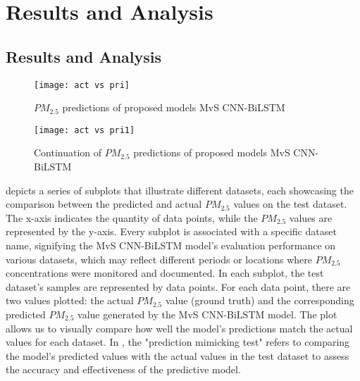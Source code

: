 
\chapter{Results and Analysis} %

\label{c5} %

\section{Results and Analysis}


\begin{figure*}
  \centering
  \texttt{[image: act vs pri]}
  \caption{$PM_{2.5}$ predictions of proposed models MvS CNN-BiLSTM}\label{ACt_vs_Pred}
\end{figure*}
\begin{figure*}
  \centering
  \texttt{[image: act vs pri1]}
  \caption{Continuation of $PM_{2.5}$ predictions of proposed models MvS CNN-BiLSTM}\label{ACt_vs_Pred1}
\end{figure*}
 depicts a series of subplots that illustrate different datasets,  each showcasing the comparison between the predicted and actual $PM_{2.5}$ values on the test dataset. The x-axis indicates the quantity of data points,  while the $PM_{2.5}$ values are represented by the y-axis. Every subplot is associated with a specific dataset name,  signifying the MvS CNN-BiLSTM model's evaluation performance on various datasets,  which may reflect different periods or locations where $PM_{2.5}$ concentrations were monitored and documented. In each subplot,  the test dataset's samples are represented by data points. For each data point,  there are two values plotted:  the actual $PM_{2.5}$ value (ground truth) and the corresponding predicted $PM_{2.5}$ value generated by the MvS CNN-BiLSTM model. The plot allows us to visually compare how well the model's predictions match the actual values for each dataset. In , the "prediction mimicking test" refers to comparing the model's predicted values with the actual values in the test dataset to assess the accuracy and effectiveness of the predictive model.





